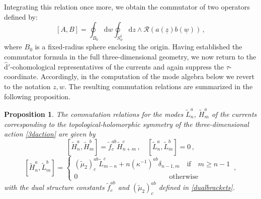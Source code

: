 \documentclass[11pt]{amsart}
\newcommand{\tL}{{\tilde L}}
\newcommand{\tH}{{\tilde H}}
\numberwithin{equation}{section}
\numberwithin{figure}{section}
\numberwithin{table}{section}
\renewcommand{\d}{\mathrm{d}}
\theoremstyle{thm}
\newtheorem{prop}[theorem]{Proposition}
\numberwithin{equation}{subsection}
\theoremstyle{definition}
\theoremstyle{rem}
\begin{document}
Integrating this relation once more, we obtain the commutator of two operators defined by:
\begin{equation}
\label{ec:3dcommutator}
    [A,B]= \oint_{B_0} \d w \oint_{S^2_{\underline w}} \d z \wedge \mathcal{R}(a(\underline z)b(\underline w)) \,,
\end{equation}
where $B_0$ is a fixed-radius sphere enclosing the origin. Having established the commutator formula in the full three-dimensional geometry, we now return to the $\hat{\d}'$-cohomological representatives of the currents and again suppress the $\tau$-coordinate. Accordingly, in the computation of the mode algebra below we revert to the notation $z,w$. The resulting commutation relations are summarized in the following proposition.
\begin{prop}
\label{thm:higherkac}
    The commutation relations for the modes $\tL_n^a$, $\tH_m^a$ of the currents corresponding to the topological-holomorphic symmetry of the three-dimensional action \eqref{3daction} are given by 
\begin{equation}
\label{ec:higherpossbrack1}
      [\tH_n^a,\tH_m^b] = \tilde f^{ab}_c\tH_{n+m}^c \,, \quad [\tL^a_n,\tL^b_m] = 0 \,, 
\end{equation}
 \begin{equation}
 \label{ec:higherpossbrack2}
      [\tH_n^a,\tL_m^b]=\begin{cases}
          (\tilde \mu_2)^{ab}_c \tL_{m-n}^c + n(\kappa^{-1})^{ab} \delta_{n-1,m} \quad \text{if}\quad m\geq  n-1 \\
          0 \qquad\qquad \qquad\qquad\qquad\quad\qquad\text{otherwise}
      \end{cases} \,,
 \end{equation}
with the dual structure constants $\tilde f^{ab}_c$ and $(\tilde\mu_2)^{ab}_c$ defined in \eqref{dualbrackets}. 

\end{prop}
\end{document}
